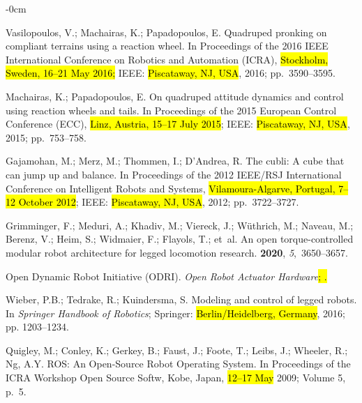 \documentclass[sensors,article,accept,pdftex,moreauthors]{Definitions/mdpi}
\begin{document}
\begin{adjustwidth}{-\extralength}{0cm}
\begin{thebibliography}{999}
Vasilopoulos, V.; Machairas, K.; Papadopoulos, E.
\newblock Quadruped pronking on compliant terrains using a reaction wheel.
\newblock In Proceedings of the 2016 IEEE International Conference on Robotics
  and Automation (ICRA), \hl{Stockholm, Sweden, 16--21 May 2016;} IEEE: \hl{Piscataway, NJ, USA},  2016; pp.~3590--3595.

Machairas, K.; Papadopoulos, E.
\newblock On quadruped attitude dynamics and control using reaction wheels and
  tails.
\newblock In Proceedings of the 2015 European Control Conference (ECC), \hl{Linz, Austria, 15--17 July 2015}; IEEE: \hl{Piscataway, NJ, USA},
  2015; pp.~753--758.

Gajamohan, M.; Merz, M.; Thommen, I.; D'Andrea, R.
\newblock The cubli: A cube that can jump up and balance.
\newblock In Proceedings of the 2012 IEEE/RSJ International Conference on
  Intelligent Robots and Systems, \hl{Vilamoura-Algarve, Portugal, 7--12 October 2012}; IEEE: \hl{Piscataway, NJ, USA},  2012; pp.~3722--3727.

Grimminger, F.; Meduri, A.; Khadiv, M.; Viereck, J.; W{\"u}thrich, M.; Naveau,
  M.; Berenz, V.; Heim, S.; Widmaier, F.; Flayols, T.;  et~al.
\newblock An open torque-controlled modular robot architecture for legged
  locomotion research.
 {\bf 2020}, {\em
  5},~3650--3657.

{Open Dynamic Robot Initiative (ODRI)}.
\newblock \emph{Open Robot Actuator Hardware}\hl{; .} %


Wieber, P.B.; Tedrake, R.; Kuindersma, S.
\newblock Modeling and control of legged robots. In {\em Springer Handbook of
  Robotics}; Springer: \hl{Berlin/Heidelberg, Germany},  2016; pp. 1203--1234.

Quigley, M.; Conley, K.; Gerkey, B.; Faust, J.; Foote, T.; Leibs, J.; Wheeler,
  R.; Ng, A.Y. 
\newblock ROS: An Open-Source Robot Operating System.
\newblock In Proceedings of the ICRA Workshop Open Source Softw, Kobe, Japan,  \hl{12--17 May} 2009; Volume 5, p.~5.


\end{thebibliography}
\end{adjustwidth}
\end{document}
